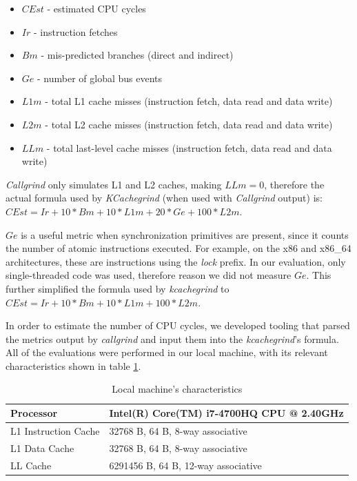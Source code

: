 \documentclass{llncs}
\begin{document}
\begin{itemize}
  \item $CEst$ - estimated CPU cycles
  \item $Ir$ - instruction fetches
  \item $Bm$ -  mis-predicted branches (direct and indirect)
  \item $Ge$ - number of global bus events
  \item $L1m$ - total L1 cache misses (instruction fetch, data read and data write)
  \item $L2m$ - total L2 cache misses (instruction fetch, data read and data write)
  \item $LLm$ - total last-level cache misses (instruction fetch, data read and data write)
\end{itemize}

\textit{Callgrind} only simulates L1 and L2 caches, making $LLm=0$, therefore the actual formula
used by \textit{KCachegrind} (when used with \textit{Callgrind} output) is:
$CEst = Ir + 10*Bm + 10*L1m + 20*Ge + 100*L2m$.

$Ge$ is a useful metric when synchronization primitives are present, since it counts the number of
atomic instructions executed. For example, on the x86 and x86\_64 architectures, these are
instructions using the \textit{lock} prefix. In our evaluation, only single-threaded code was used, therefore
reason we did not measure $Ge$. This further simplified the formula used by \textit{kcachegrind} to
$CEst = Ir + 10*Bm + 10*L1m + 100*L2m$.

In order to estimate the number of CPU cycles, we developed tooling that parsed the metrics output by
\textit{callgrind} and input them into the \textit{kcachegrind}'s formula. All of the evaluations were performed in
our local machine, with its relevant characteristics shown in table \ref{table:local-machine}.

\begin{table}[]
\begin{tabular}{|l|l|}
\hline
Processor            & Intel(R) Core(TM) i7-4700HQ CPU @ 2.40GHz \\ \hline
L1 Instruction Cache & 32768 B, 64 B, 8-way associative          \\ \hline
L1 Data Cache        & 32768 B, 64 B, 8-way associative          \\ \hline
LL Cache             & 6291456 B, 64 B, 12-way associative       \\ \hline
\end{tabular}
\centering \caption{\label{table:local-machine} Local machine's characteristics}
\end{table}
\end{document}
